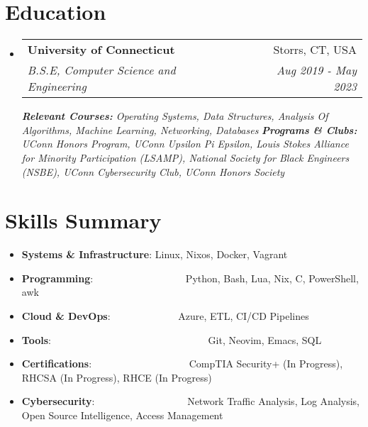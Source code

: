 \documentclass[a4paper,11pt]{article}
\makeatletter
\newcommand{\resumeItem}[2]{
  \item\small{
    \textbf{#1}{: #2 \vspace{-2pt}}
  }
}
\newcommand{\resumeSubheading}[4]{
  \vspace{-1pt}\item
    \begin{tabular*}{0.97\textwidth}{l@{\extracolsep{\fill}}r}
      \textbf{#1} & #2 \\
      \textit{#3} & \textit{#4} \\
    \end{tabular*}\vspace{-5pt}
}
\newcommand{\resumeSubItem}[2]{\resumeItem{#1}{#2}\vspace{-3pt}}
\newcommand{\resumeSubHeadingListStart}{\begin{itemize}[leftmargin=*]}
\newcommand{\resumeSubHeadingListEnd}{\end{itemize}}
\makeatother
\begin{document}
\section{Education}

\vspace{5pt}
  \begin{itemize}[leftmargin=0pt, label={}]  %
    \resumeSubheading
      {University of Connecticut}{Storrs, CT, USA}
      {B.S.E, Computer Science and Engineering}{Aug 2019 - May 2023}
      \vspace{5pt}
      {\scriptsize \textit{ \footnotesize{\newline{}\textbf{Relevant Courses:} Operating Systems, Data Structures, Analysis Of Algorithms, Machine Learning, Networking, Databases}}}
      {\scriptsize \textit{ \footnotesize{\newline{}\textbf{Programs \& Clubs:}
  UConn Honors Program, UConn Upsilon Pi Epsilon, Louis Stokes Alliance for Minority Participation (LSAMP), National Society for Black Engineers (NSBE), UConn Cybersecurity Club, UConn Honors Society}}}
  \end{itemize}
  
\section{Skills Summary}
    \vspace{1pt}
	\resumeSubHeadingListStart
	\resumeSubItem{Systems \& Infrastructure}{Linux, Nixos, Docker, Vagrant}
	\resumeSubItem{Programming}{~~~~~~~~~~~~~~~~~~Python, Bash, Lua, Nix, C, PowerShell, awk}
	\resumeSubItem{Cloud \& DevOps}{~~~~~~~~~~~~~Azure, ETL, CI/CD Pipelines}
	\resumeSubItem{Tools}{~~~~~~~~~~~~~~~~~~~~~~~~~~~~~~~Git, Neovim, Emacs, SQL}
	\resumeSubItem{Certifications}{~~~~~~~~~~~~~~~~~~~CompTIA Security+ (In Progress), RHCSA (In Progress), RHCE (In Progress)}
        \resumeSubItem{Cybersecurity}{~~~~~~~~~~~~~~~~~~Network Traffic Analysis, Log Analysis, Open Source Intelligence, Access Management}
\resumeSubHeadingListEnd
\end{document}
